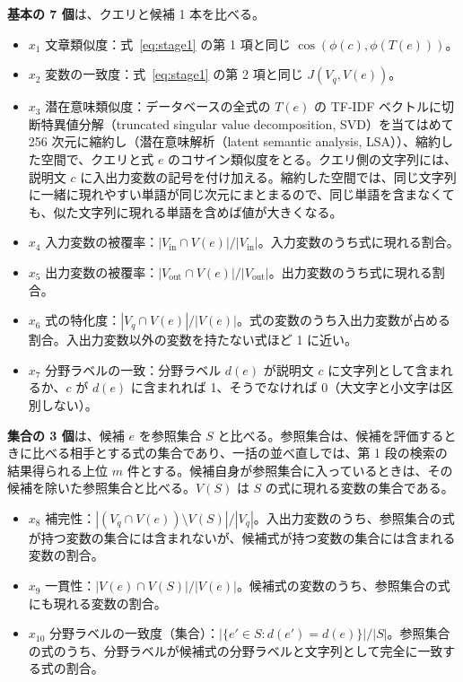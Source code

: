 \documentclass[a4j,dvipdfmx,11pt]{jresume}
\newcommand{\Vin}{V_{\mathrm{in}}}
\newcommand{\Vout}{V_{\mathrm{out}}}
\begin{document}
\textbf{基本の 7 個}は、クエリと候補 1 本を比べる。
\begin{itemize}[leftmargin=1.5em]
  \item $x_1$ 文章類似度：式~\eqref{eq:stage1} の第 1 項と同じ $\cos(\phi(c), \phi(T(e)))$。
  \item $x_2$ 変数の一致度：式~\eqref{eq:stage1} の第 2 項と同じ $J(V_q, V(e))$。
  \item $x_3$ 潜在意味類似度：データベースの全式の $T(e)$ の TF-IDF ベクトルに切断特異値分解（truncated singular value decomposition, SVD）を当てはめて 256 次元に縮約し（潜在意味解析（latent semantic analysis, LSA））、縮約した空間で、クエリと式 $e$ のコサイン類似度をとる。クエリ側の文字列には、説明文 $c$ に入出力変数の記号を付け加える。縮約した空間では、同じ文字列に一緒に現れやすい単語が同じ次元にまとまるので、同じ単語を含まなくても、似た文字列に現れる単語を含めば値が大きくなる。
  \item $x_4$ 入力変数の被覆率：$|\Vin \cap V(e)| / |\Vin|$。入力変数のうち式に現れる割合。
  \item $x_5$ 出力変数の被覆率：$|\Vout \cap V(e)| / |\Vout|$。出力変数のうち式に現れる割合。
  \item $x_6$ 式の特化度：$|V_q \cap V(e)| / |V(e)|$。式の変数のうち入出力変数が占める割合。入出力変数以外の変数を持たない式ほど 1 に近い。
  \item $x_7$ 分野ラベルの一致：分野ラベル $d(e)$ が説明文 $c$ に文字列として含まれるか、$c$ が $d(e)$ に含まれれば 1、そうでなければ 0（大文字と小文字は区別しない）。
\end{itemize}

\textbf{集合の 3 個}は、候補 $e$ を参照集合 $S$ と比べる。参照集合は、候補を評価するときに比べる相手とする式の集合であり、一括の並べ直しでは、第 1 段の検索の結果得られる上位 $m$ 件とする。候補自身が参照集合に入っているときは、その候補を除いた参照集合と比べる。$V(S)$ は $S$ の式に現れる変数の集合である。
\begin{itemize}[leftmargin=1.5em]
  \item $x_8$ 補完性：$|(V_q \cap V(e)) \setminus V(S)| / |V_q|$。入出力変数のうち、参照集合の式が持つ変数の集合には含まれないが、候補式が持つ変数の集合には含まれる変数の割合。
  \item $x_9$ 一貫性：$|V(e) \cap V(S)| / |V(e)|$。候補式の変数のうち、参照集合の式にも現れる変数の割合。
  \item $x_{10}$ 分野ラベルの一致度（集合）：$|\{e' \in S : d(e') = d(e)\}| / |S|$。参照集合の式のうち、分野ラベルが候補式の分野ラベルと文字列として完全に一致する式の割合。
\end{itemize}
\end{document}
